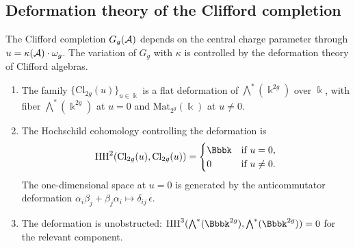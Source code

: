 %
%

\subsection{Deformation theory of the Clifford completion}
\label{subsec:clifford-deformation}

The Clifford completion $G_g(\mathcal{A})$ depends on the central charge
parameter through $u = \kappa(\mathcal{A}) \cdot \omega_g$. The variation of
$G_g$ with $\kappa$ is controlled by the deformation theory of
Clifford algebras.

\begin{proposition}
\label{prop:g9-clifford-deformation}
\begin{enumerate}[label=\textup{(\roman*)}]
\item The family $\{\mathrm{Cl}_{2g}(u)\}_{u \in \Bbbk}$ is a flat
deformation of $\bigwedge^*(\Bbbk^{2g})$ over $\Bbbk$, with fiber
$\bigwedge^*(\Bbbk^{2g})$ at $u = 0$ and
$\mathrm{Mat}_{2^g}(\Bbbk)$ at $u \neq 0$.

\item The Hochschild cohomology controlling the deformation is
\begin{equation}\label{eq:g9-HH-clifford}
\HH^2(\mathrm{Cl}_{2g}(u), \mathrm{Cl}_{2g}(u))
=
\begin{cases}
\Bbbk & \text{if } u = 0, \\
0 & \text{if } u \neq 0.
\end{cases}
\end{equation}
The one-dimensional space at $u = 0$ is generated by the
anticommutator deformation $\alpha_i\beta_j + \beta_j\alpha_i
\mapsto \delta_{ij}\,\epsilon$.

\item The deformation is unobstructed: $\HH^3(\bigwedge^*(\Bbbk^{2g}),
\bigwedge^*(\Bbbk^{2g})) = 0$ for the relevant component.
\end{enumerate}
\end{proposition}

